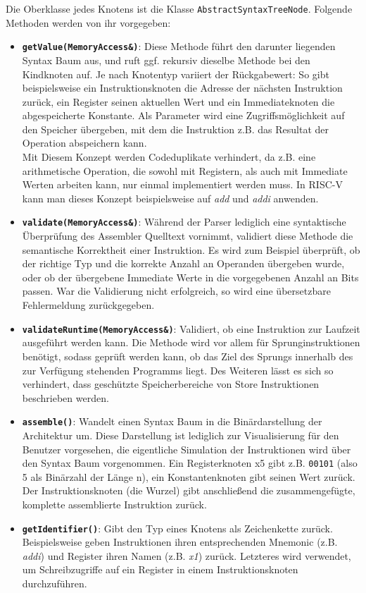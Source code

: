 Die Oberklasse jedes Knotens ist die Klasse \texttt{AbstractSyntaxTreeNode}.
Folgende Methoden werden von ihr vorgegeben:

\begin{itemize}
	\label{dev-manual-arch-node-functions}
	\item \textbf{\texttt{getValue(MemoryAccess\&)}}: Diese Methode führt den
	darunter liegenden Syntax Baum aus, und ruft ggf. rekursiv dieselbe Methode
	bei den Kindknoten auf. Je nach Knotentyp variiert der Rückgabewert: So gibt
	beispielsweise ein Instruktionsknoten die Adresse der nächsten Instruktion
	zurück, ein Register seinen aktuellen Wert und ein Immediateknoten die
	abgespeicherte Konstante. Als Parameter wird eine Zugriffsmöglichkeit auf den
	Speicher übergeben, mit dem die Instruktion z.B. das Resultat der Operation
	abspeichern kann. \\
	Mit Diesem Konzept werden Codeduplikate verhindert, da z.B. eine arithmetische
	Operation, die sowohl mit Registern, als auch mit Immediate Werten arbeiten
	kann, nur einmal implementiert werden muss. In RISC-V kann man dieses Konzept
	beispielsweise auf \textit{add} und \textit{addi} anwenden.

	\item \textbf{\texttt{validate(MemoryAccess\&)}}: Während der Parser lediglich
	eine syntaktische Überprüfung des Assembler Quelltext vornimmt, validiert
	diese Methode die semantische Korrektheit einer Instruktion. Es wird zum
	Beispiel überprüft, ob der richtige Typ und die korrekte Anzahl an Operanden
	übergeben wurde, oder ob der übergebene Immediate Werte in die vorgegebenen
	Anzahl an Bits passen. War die Validierung nicht erfolgreich, so wird eine
	übersetzbare Fehlermeldung zurückgegeben.

	\item \textbf{\texttt{validateRuntime(MemoryAccess\&)}}: Validiert, ob eine
	Instruktion zur Laufzeit ausgeführt werden kann. Die Methode wird vor allem
	für Sprunginstruktionen benötigt, sodass geprüft werden kann, ob das Ziel
	des Sprungs innerhalb des zur Verfügung stehenden Programms liegt. Des
	Weiteren lässt es sich so verhindert, dass geschützte Speicherbereiche
	von Store Instruktionen beschrieben werden.

	\item \textbf{\texttt{assemble()}}: Wandelt einen Syntax Baum in die
	Binärdarstellung der Architektur um. Diese Darstellung ist lediglich zur
	Visualisierung für den Benutzer vorgesehen, die eigentliche Simulation der
	Instruktionen wird über den Syntax Baum vorgenommen. Ein Registerknoten x5 
	gibt z.B. \texttt{00101} (also 5 als Binärzahl der Länge n), ein Konstantenknoten gibt seinen Wert
	zurück. Der Instruktionsknoten (die Wurzel) gibt anschließend die
	zusammengefügte, komplette assemblierte Instruktion zurück.

	\item \textbf{\texttt{getIdentifier()}}: Gibt den Typ eines Knotens als
	Zeichenkette zurück. Beispielsweise geben Instruktionen ihren entsprechenden
	Mnemonic (z.B. \textit{addi}) und Register ihren Namen (z.B. \textit{x1})
	zurück. Letzteres wird verwendet, um Schreibzugriffe auf ein Register
	in einem Instruktionsknoten durchzuführen.
\end{itemize}

